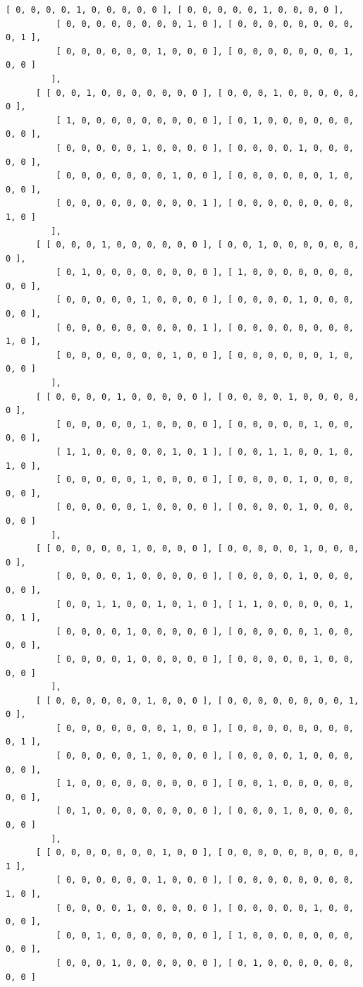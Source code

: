\documentclass[a4paper, 10pt]{book}
\theoremstyle{definition}
\numberwithin{equation}{chapter}
\begin{document}
\begin{appendices}
\begin{enumerate}
\begin{lstlisting}[numbers=none]
          [ 0, 0, 0, 0, 1, 0, 0, 0, 0, 0 ], [ 0, 0, 0, 0, 0, 1, 0, 0, 0, 0 ],
          [ 0, 0, 0, 0, 0, 0, 0, 0, 1, 0 ], [ 0, 0, 0, 0, 0, 0, 0, 0, 0, 1 ],
          [ 0, 0, 0, 0, 0, 0, 1, 0, 0, 0 ], [ 0, 0, 0, 0, 0, 0, 0, 1, 0, 0 ] 
         ], 
      [ [ 0, 0, 1, 0, 0, 0, 0, 0, 0, 0 ], [ 0, 0, 0, 1, 0, 0, 0, 0, 0, 0 ], 
          [ 1, 0, 0, 0, 0, 0, 0, 0, 0, 0 ], [ 0, 1, 0, 0, 0, 0, 0, 0, 0, 0 ],
          [ 0, 0, 0, 0, 0, 1, 0, 0, 0, 0 ], [ 0, 0, 0, 0, 1, 0, 0, 0, 0, 0 ],
          [ 0, 0, 0, 0, 0, 0, 0, 1, 0, 0 ], [ 0, 0, 0, 0, 0, 0, 1, 0, 0, 0 ],
          [ 0, 0, 0, 0, 0, 0, 0, 0, 0, 1 ], [ 0, 0, 0, 0, 0, 0, 0, 0, 1, 0 ] 
         ], 
      [ [ 0, 0, 0, 1, 0, 0, 0, 0, 0, 0 ], [ 0, 0, 1, 0, 0, 0, 0, 0, 0, 0 ], 
          [ 0, 1, 0, 0, 0, 0, 0, 0, 0, 0 ], [ 1, 0, 0, 0, 0, 0, 0, 0, 0, 0 ],
          [ 0, 0, 0, 0, 0, 1, 0, 0, 0, 0 ], [ 0, 0, 0, 0, 1, 0, 0, 0, 0, 0 ],
          [ 0, 0, 0, 0, 0, 0, 0, 0, 0, 1 ], [ 0, 0, 0, 0, 0, 0, 0, 0, 1, 0 ],
          [ 0, 0, 0, 0, 0, 0, 0, 1, 0, 0 ], [ 0, 0, 0, 0, 0, 0, 1, 0, 0, 0 ] 
         ], 
      [ [ 0, 0, 0, 0, 1, 0, 0, 0, 0, 0 ], [ 0, 0, 0, 0, 1, 0, 0, 0, 0, 0 ], 
          [ 0, 0, 0, 0, 0, 1, 0, 0, 0, 0 ], [ 0, 0, 0, 0, 0, 1, 0, 0, 0, 0 ],
          [ 1, 1, 0, 0, 0, 0, 0, 1, 0, 1 ], [ 0, 0, 1, 1, 0, 0, 1, 0, 1, 0 ],
          [ 0, 0, 0, 0, 0, 1, 0, 0, 0, 0 ], [ 0, 0, 0, 0, 1, 0, 0, 0, 0, 0 ],
          [ 0, 0, 0, 0, 0, 1, 0, 0, 0, 0 ], [ 0, 0, 0, 0, 1, 0, 0, 0, 0, 0 ] 
         ], 
      [ [ 0, 0, 0, 0, 0, 1, 0, 0, 0, 0 ], [ 0, 0, 0, 0, 0, 1, 0, 0, 0, 0 ], 
          [ 0, 0, 0, 0, 1, 0, 0, 0, 0, 0 ], [ 0, 0, 0, 0, 1, 0, 0, 0, 0, 0 ],
          [ 0, 0, 1, 1, 0, 0, 1, 0, 1, 0 ], [ 1, 1, 0, 0, 0, 0, 0, 1, 0, 1 ],
          [ 0, 0, 0, 0, 1, 0, 0, 0, 0, 0 ], [ 0, 0, 0, 0, 0, 1, 0, 0, 0, 0 ],
          [ 0, 0, 0, 0, 1, 0, 0, 0, 0, 0 ], [ 0, 0, 0, 0, 0, 1, 0, 0, 0, 0 ] 
         ], 
      [ [ 0, 0, 0, 0, 0, 0, 1, 0, 0, 0 ], [ 0, 0, 0, 0, 0, 0, 0, 0, 1, 0 ], 
          [ 0, 0, 0, 0, 0, 0, 0, 1, 0, 0 ], [ 0, 0, 0, 0, 0, 0, 0, 0, 0, 1 ],
          [ 0, 0, 0, 0, 0, 1, 0, 0, 0, 0 ], [ 0, 0, 0, 0, 1, 0, 0, 0, 0, 0 ],
          [ 1, 0, 0, 0, 0, 0, 0, 0, 0, 0 ], [ 0, 0, 1, 0, 0, 0, 0, 0, 0, 0 ],
          [ 0, 1, 0, 0, 0, 0, 0, 0, 0, 0 ], [ 0, 0, 0, 1, 0, 0, 0, 0, 0, 0 ] 
         ], 
      [ [ 0, 0, 0, 0, 0, 0, 0, 1, 0, 0 ], [ 0, 0, 0, 0, 0, 0, 0, 0, 0, 1 ], 
          [ 0, 0, 0, 0, 0, 0, 1, 0, 0, 0 ], [ 0, 0, 0, 0, 0, 0, 0, 0, 1, 0 ],
          [ 0, 0, 0, 0, 1, 0, 0, 0, 0, 0 ], [ 0, 0, 0, 0, 0, 1, 0, 0, 0, 0 ],
          [ 0, 0, 1, 0, 0, 0, 0, 0, 0, 0 ], [ 1, 0, 0, 0, 0, 0, 0, 0, 0, 0 ],
          [ 0, 0, 0, 1, 0, 0, 0, 0, 0, 0 ], [ 0, 1, 0, 0, 0, 0, 0, 0, 0, 0 ] 

\end{lstlisting}
\end{enumerate}
\end{appendices}
\end{document}
